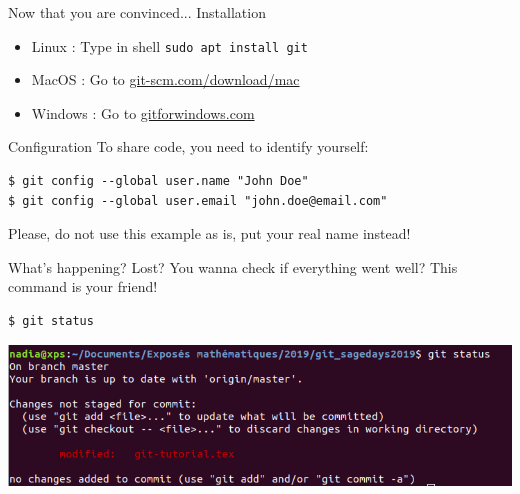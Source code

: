 \documentclass{beamer}
\begin{document}
	\begin{frame}{Now that you are convinced... Installation}
		\begin{itemize}
			\item Linux : Type in shell \texttt{sudo apt install git}
			\item MacOS : Go to \url{git-scm.com/download/mac}
			\item Windows : Go to \url{gitforwindows.com}
		\end{itemize}
	\end{frame}
	\begin{frame}[fragile]{Configuration}
	To share code, you need to identify yourself:
	\begin{verbatim}
$ git config --global user.name "John Doe"
$ git config --global user.email "john.doe@email.com"
	\end{verbatim}
	Please, do not use this example as is, put your real name instead!
	\end{frame}

	\begin{frame}[fragile]{What's happening?}
		Lost? You wanna check if everything went well? This command is your friend!
		\begin{verbatim}
$ git status
		\end{verbatim}
		\begin{center}
			\includegraphics[width=\linewidth]{status}
		\end{center}
	\end{frame}
\end{document}
